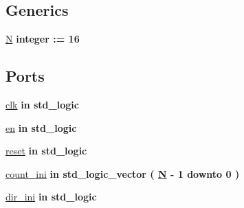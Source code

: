 \subsection*{Generics}
 \begin{DoxyCompactItemize}
\item 
\hyperlink{classportadora__tringular_af8ee6f7e8fea0e211d86d8e3fd6f8d29}{N} {\bfseries {\bfseries \textcolor{comment}{integer}\textcolor{vhdlchar}{ }\textcolor{vhdlchar}{ }\textcolor{vhdlchar}{\+:}\textcolor{vhdlchar}{=}\textcolor{vhdlchar}{ }\textcolor{vhdlchar}{ } \textcolor{vhdldigit}{16} \textcolor{vhdlchar}{ }}}
\end{DoxyCompactItemize}
\subsection*{Ports}
 \begin{DoxyCompactItemize}
\item 
\hyperlink{classportadora__tringular_a4a4609c199d30b3adebbeb3a01276ec5}{clk}  {\bfseries {\bfseries \textcolor{keywordflow}{in}\textcolor{vhdlchar}{ }}} {\bfseries \textcolor{comment}{std\+\_\+logic}\textcolor{vhdlchar}{ }} 
\item 
\hyperlink{classportadora__tringular_adcf9c6f5161d039addbda5819bee64a3}{en}  {\bfseries {\bfseries \textcolor{keywordflow}{in}\textcolor{vhdlchar}{ }}} {\bfseries \textcolor{comment}{std\+\_\+logic}\textcolor{vhdlchar}{ }} 
\item 
\hyperlink{classportadora__tringular_aad8dc6359d9e23dabcbf342fadf2fa06}{reset}  {\bfseries {\bfseries \textcolor{keywordflow}{in}\textcolor{vhdlchar}{ }}} {\bfseries \textcolor{comment}{std\+\_\+logic}\textcolor{vhdlchar}{ }} 
\item 
\hyperlink{classportadora__tringular_ab3bb50450dbeb3852b4f76ef2aefbf9e}{count\+\_\+ini}  {\bfseries {\bfseries \textcolor{keywordflow}{in}\textcolor{vhdlchar}{ }}} {\bfseries \textcolor{comment}{std\+\_\+logic\+\_\+vector}\textcolor{vhdlchar}{ }\textcolor{vhdlchar}{(}\textcolor{vhdlchar}{ }\textcolor{vhdlchar}{ }\textcolor{vhdlchar}{ }\textcolor{vhdlchar}{ }{\bfseries \hyperlink{classportadora__tringular_af8ee6f7e8fea0e211d86d8e3fd6f8d29}{N}} \textcolor{vhdlchar}{-\/}\textcolor{vhdlchar}{ } \textcolor{vhdldigit}{1} \textcolor{vhdlchar}{ }\textcolor{keywordflow}{downto}\textcolor{vhdlchar}{ }\textcolor{vhdlchar}{ } \textcolor{vhdldigit}{0} \textcolor{vhdlchar}{ }\textcolor{vhdlchar}{)}\textcolor{vhdlchar}{ }} 
\item 
\hyperlink{classportadora__tringular_ac855daed6a8d1b25a13c5d5b4aa46c3e}{dir\+\_\+ini}  {\bfseries {\bfseries \textcolor{keywordflow}{in}\textcolor{vhdlchar}{ }}} {\bfseries \textcolor{comment}{std\+\_\+logic}\textcolor{vhdlchar}{ }} 

\end{DoxyCompactItemize}
